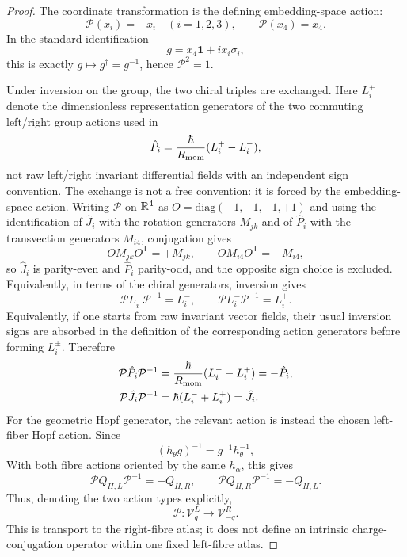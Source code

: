\documentclass[12pt,a4paper]{article}
\begin{document}
\begin{proof}
\leavevmode\par\noindent
The coordinate transformation is the defining embedding-space action:
\[
  \mathcal{P}(x_i)=-x_i\quad (i=1,2,3),
  \qquad
  \mathcal{P}(x_4)=x_4.
\]
In the standard identification
\[
  g=x_4\mathbf 1+i x_i\sigma_i,
\]
this is exactly \(g\mapsto g^\dagger=g^{-1}\), hence
\(\mathcal P^2=1\).

Under inversion on the group, the two chiral triples are exchanged.  Here
\(L_i^\pm\) denote the dimensionless representation generators of the two
commuting left/right group actions used in
\[
  \hat P_i=\frac{\hbar}{R_{\mathrm{mom}}}(L_i^+-L_i^-),
\]
not raw left/right invariant differential fields with an independent sign
convention.  The exchange is not a free convention: it is forced by the
embedding-space action.  Writing \(\mathcal P\) on \(\mathbb{R}^4\) as
\(O=\mathrm{diag}(-1,-1,-1,+1)\) and using the identification of \(\hat J_i\) with
the rotation generators \(M_{jk}\) and of \(\hat P_i\) with the transvection
generators \(M_{i4}\), conjugation gives
\[
  OM_{jk}O^{\mathsf T}=+M_{jk},
  \qquad
  OM_{i4}O^{\mathsf T}=-M_{i4},
\]
so \(\hat J_i\) is parity-even and \(\hat P_i\) parity-odd, and the opposite sign
choice is excluded.  Equivalently, in terms of the chiral generators, inversion
gives
\[
  \mathcal{P}L_i^+\mathcal{P}^{-1}=L_i^-,
  \qquad
  \mathcal{P}L_i^-\mathcal{P}^{-1}=L_i^+.
\]
Equivalently, if one starts from raw invariant vector fields, their usual
inversion signs are absorbed in the definition of the corresponding action
generators before forming \(L_i^\pm\).  Therefore
\[
\begin{aligned}
  \mathcal{P}\hat P_i\mathcal{P}^{-1}
  &=\frac{\hbar}{R_{\mathrm{mom}}}(L_i^- - L_i^+)
   =-\hat P_i,
  \\
  \mathcal{P}\hat J_i\mathcal{P}^{-1}
  &=\hbar(L_i^-+L_i^+)
   =\hat J_i.
\end{aligned}
\]
For the geometric Hopf generator, the relevant action is instead the chosen
left-fiber Hopf action.  Since
\[
  (h_\theta g)^{-1}=g^{-1}h_\theta^{-1},
\]
With both fibre actions oriented by the same \(h_\alpha\), this gives
\[
 \mathcal P Q_{H,L}\mathcal P^{-1}=-Q_{H,R},\qquad
 \mathcal P Q_{H,R}\mathcal P^{-1}=-Q_{H,L}.
\]
Thus, denoting the two action types explicitly,
\[
 \mathcal P:\mathcal V_q^L\longrightarrow\mathcal V_{-q}^R.
\]
This is transport to the right-fibre atlas; it does not define an intrinsic
charge-conjugation operator within one fixed left-fibre atlas.
\end{proof}
\end{document}
